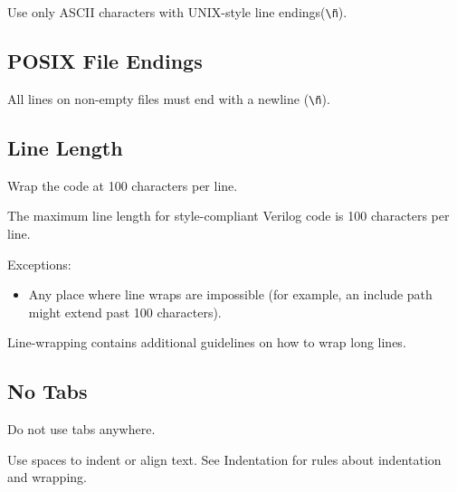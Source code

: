       \begin{keybox}
        Use only ASCII characters with UNIX-style line endings(\texttt{\" \textbackslash n\"}).
      \end{keybox}

    \subsection{POSIX File Endings}
    \label{systemverilog_conventions:general_file_rules:posix_file_endings}

      \begin{keybox}
        All lines on non-empty files must end with a newline (\texttt{\" \textbackslash n\"}).
      \end{keybox}

    \subsection{Line Length}
    \label{systemverilog_conventions:general_file_rules:systemverilog_conventions:general_file_rules:line_length}

      \begin{keybox}
        Wrap the code at 100 characters per line.
      \end{keybox}

      The maximum line length for style-compliant Verilog code is 100 characters per line.

      Exceptions:

      \begin{itemize}
        \item Any place where line wraps are impossible (for example, an include path might extend past 100 characters).
      \end{itemize}

      Line-wrapping contains additional guidelines on how to wrap long lines.

    \subsection{No Tabs}
    \label{systemverilog_conventions:general_file_rules:no_tabs}

      \begin{keybox}
        Do not use tabs anywhere.
      \end{keybox}

      Use spaces to indent or align text. See Indentation for rules about indentation and wrapping.

